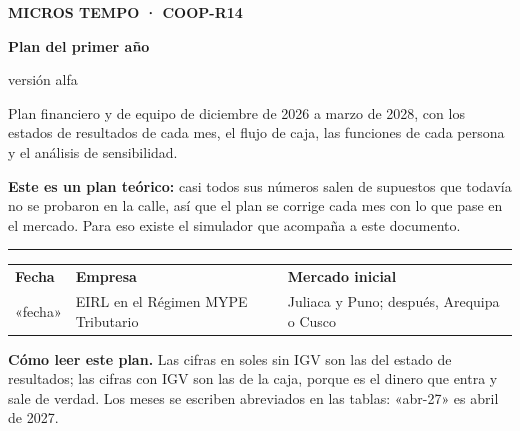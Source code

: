 \documentclass[10.5pt,a4paper]{article}
\begin{document}
\begin{titlepage}
\thispagestyle{empty}
\vspace*{1.2cm}
{\small\bfseries\color{marca}\MakeUppercase{Micros Tempo · COOP-R14}}\par\vspace{14pt}
{\fontsize{34}{38}\selectfont\bfseries Plan del primer año}\par\vspace{6pt}
{\fontsize{20}{24}\selectfont\color{tinta2} versión alfa}\par\vspace{18pt}
\begin{minipage}{0.82\linewidth}\large\color{tinta2}
Plan financiero y de equipo de diciembre de 2026 a marzo de 2028, con los estados de resultados de cada mes, el flujo de caja, las funciones de cada persona y el análisis de sensibilidad.
\end{minipage}

\vfill
\begin{aviso}
\textbf{Este es un plan teórico:} casi todos sus números salen de supuestos que todavía no se probaron en la calle, así que el plan se corrige cada mes con lo que pase en el mercado. Para eso existe el simulador que acompaña a este documento.
\end{aviso}
\vspace{10pt}
{\color{linea}\rule{\linewidth}{0.8pt}}\par\vspace{4pt}
\begin{tabularx}{\linewidth}{@{}XXX@{}}
{\footnotesize\bfseries Fecha} & {\footnotesize\bfseries Empresa} & {\footnotesize\bfseries Mercado inicial}\\
{\footnotesize\color{tinta2}«fecha»} & {\footnotesize\color{tinta2}EIRL en el Régimen MYPE Tributario} & {\footnotesize\color{tinta2}Juliaca y Puno; después, Arequipa o Cusco}
\end{tabularx}
\end{titlepage}

{\setcounter{tocdepth}{1}\tableofcontents}
\vspace{12pt}
\begin{nota}
\textbf{Cómo leer este plan.} Las cifras en soles sin IGV son las del estado de resultados; las cifras con IGV son las de la caja, porque es el dinero que entra y sale de verdad. Los meses se escriben abreviados en las tablas: «abr-27» es abril de 2027.
\end{nota}
\newpage
\end{document}
